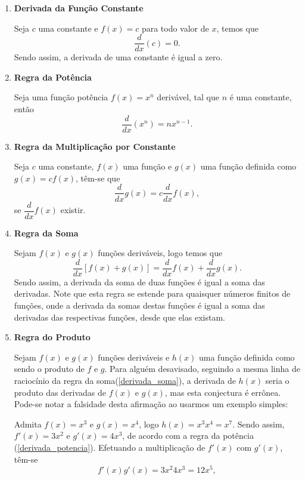 \documentclass[
	12pt,				%
	openright,			%
    twoside,			%
	a4paper,			%
	chapter=TITLE,		%
	english,			%
	french,				%
	spanish,			%
	brazil				%
	]{abntex2}
\numberwithin{lema}{chapter}
\numberwithin{teorema}{chapter}
\numberwithin{definicao}{chapter}
\numberwithin{exemplo}{chapter}
\numberwithin{figure}{chapter}
\begin{document}
\begin{enumerate}
	\item \textbf{Derivada da Função Constante}
	\label{derivada_constante}
	
	Seja $c$ uma constante e $f(x) = c$ para todo valor de $x$, temos que	$$\frac{d}{dx}(c) = 0.$$
	Sendo assim, a derivada de uma constante é igual a zero.
	
	\item \textbf{Regra da Potência}
	\label{derivada_potencia}
	
	Seja uma função potência $f(x) = x^{n}$ derivável, tal que $n$ é uma constante, então
	$$\frac{d}{dx}(x^{n}) = nx^{n-1}.$$
	
	\item \textbf{Regra da Multiplicação por Constante}
	\label{derivada_multiplicacao_constante}
	
	Seja $c$ uma constante, $f(x)$ uma função e $g(x)$ uma função definida como $g(x) = cf(x)$, têm-se que	
	$$\frac{d}{dx}g(x) = c \frac{d}{dx}f(x),$$
	se $\dfrac{d}{dx}f(x)$ existir.
	
	\item \textbf{Regra da Soma}
	\label{derivada_soma}
	
	Sejam $f(x)$ e $g(x)$ funções deriváveis, logo temos que
	$$\frac{d}{dx}[f(x) + g(x)] = \frac{d}{dx}f(x) + \frac{d}{dx}g(x).$$
	Sendo assim, a derivada da soma de duas funções é igual a soma das derivadas. Note que esta regra se estende para quaisquer números finitos de funções, onde a derivada da somas destas funções é igual a soma das derivadas das respectivas funções, desde que elas existam. 
	
	\item \textbf{Regra do Produto}
	
	Sejam $f(x)$ e $g(x)$ funções deriváveis e $h(x)$ uma função definida como sendo o produto de $f$ e $g$. Para alguém desavisado, seguindo a mesma linha de raciocínio da regra da soma(\ref{derivada_soma}), a derivada de $h(x)$ seria o produto das derivadas de $f(x)$ e $g(x)$, mas esta conjectura é errônea. Pode-se notar a falsidade desta afirmação ao usarmos um exemplo simples:
	
	Admita $f(x) = x^{3}$ e $g(x) = x^{4}$, logo $h(x) = x^{3}x^{4} = x^{7}$. Sendo assim, $f'(x) = 3x^{2}$ e $g'(x) = 4x^{3}$, de acordo com a regra da potência (\ref{derivada_potencia}). Efetuando a multiplicação de $f'(x)$ com $g'(x)$, têm-se	
	$$ f'(x)g'(x) = 3x^{2}4x^{3} = 12x^{5}, $$
	

\end{enumerate}
\end{document}
